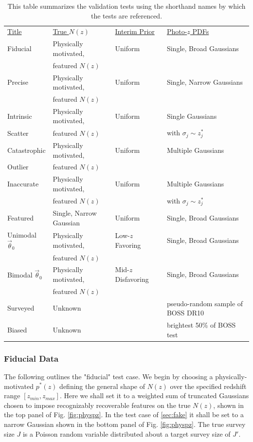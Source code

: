 \documentclass[preprint]{aastex}
\newcommand{\textul}{\underline}
\begin{document}
\begin{table}
\begin{tabular}{llll}
\textul{Title} & \textul{True $N(z)$} & \textul{Interim Prior} & 
\textul{Photo-$z$ PDFs}\\
Fiducial & Physically motivated, & Uniform & Single, Broad Gaussians\\
& featured $N(z)$ &&\\
Precise & Physically motivated, & Uniform & Single, Narrow Gaussians\\
& featured $N(z)$ &&\\
Intrinsic & Physically motivated, & Uniform & Single Gaussians\\
Scatter & featured $N(z)$ && with $\sigma_{j}\sim z^{*}_{j}$\\
Catastrophic & Physically motivated, & Uniform & Multiple Gaussians\\
Outlier & featured $N(z)$ &&\\
Inaccurate & Physically motivated, & Uniform & Multiple Gaussians\\
& featured $N(z)$ && with $\sigma_{j}\sim z^{*}_{j}$\\
Featured & Single, Narrow Gaussian & Uniform & Single, Broad Gaussians\\
Unimodal $\vec{\theta}_{0}$ & Physically motivated, & Low-$z$ Favoring & 
Single, Broad Gaussians\\
& featured $N(z)$ &&\\
Bimodal $\vec{\theta}_{0}$& Physically motivated, & Mid-$z$ Disfavoring & 
Single, Broad Gaussians\\
& featured $N(z)$ &&\\
Surveyed & Unknown & \citet{Sheldon2012} & pseudo-random sample of BOSS DR10\\
Biased & Unknown & \citet{Sheldon2012} & brightest 50\% of BOSS test
\end{tabular}
\caption{This table summarizes the validation tests using the shorthand names 
by which the tests are referenced.}
\label{tab:key}
\end{table}

\subsubsection{Fiducial Data}
\label{sec:mock}

The following outlines the "fiducial" test case.  We begin by choosing a 
physically-motivated $p^{*}(z)$ defining the general shape of $N(z)$ over the 
specified redshift range $[z_{min},z_{max}]$.  Here we shall set it to a 
weighted sum of truncated Gaussians chosen to impose recognizably recoverable 
features on the true $N(z)$, shown in the top panel of Fig. \ref{fig:physpz}.  
In the test case of \ref{sec:fake} it shall be set to a narrow Gaussian shown 
in the bottom panel of Fig. \ref{fig:physpz}.  The true survey size $J$ is a 
Poisson random variable distributed about a target survey size of $J'$.
\end{document}
